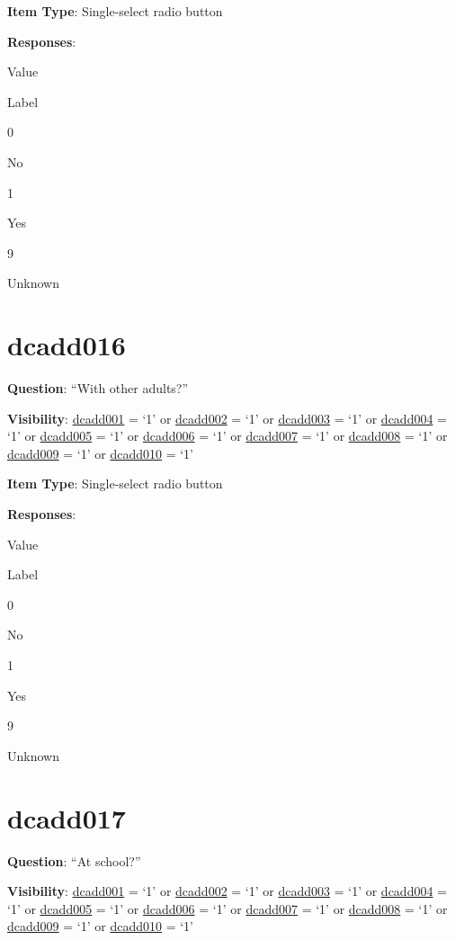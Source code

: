 \documentclass[]{book}
\begin{document}
\textbf{Item Type}: Single-select radio button

\textbf{Responses}:

Value

Label

0

No

1

Yes

9

Unknown

\hypertarget{dcadd016}{%
\section{dcadd016}\label{dcadd016}}

\textbf{Question}: ``With other adults?''

\textbf{Visibility}: \protect\hyperlink{dcadd001}{dcadd001} = `1' or \protect\hyperlink{dcadd002}{dcadd002} = `1' or \protect\hyperlink{dcadd003}{dcadd003} = `1' or \protect\hyperlink{dcadd004}{dcadd004} = `1' or \protect\hyperlink{dcadd005}{dcadd005} = `1' or \protect\hyperlink{dcadd006}{dcadd006} = `1' or \protect\hyperlink{dcadd007}{dcadd007} = `1' or \protect\hyperlink{dcadd008}{dcadd008} = `1' or \protect\hyperlink{dcadd009}{dcadd009} = `1' or \protect\hyperlink{dcadd010}{dcadd010} = `1'

\textbf{Item Type}: Single-select radio button

\textbf{Responses}:

Value

Label

0

No

1

Yes

9

Unknown

\hypertarget{dcadd017}{%
\section{dcadd017}\label{dcadd017}}

\textbf{Question}: ``At school?''

\textbf{Visibility}: \protect\hyperlink{dcadd001}{dcadd001} = `1' or \protect\hyperlink{dcadd002}{dcadd002} = `1' or \protect\hyperlink{dcadd003}{dcadd003} = `1' or \protect\hyperlink{dcadd004}{dcadd004} = `1' or \protect\hyperlink{dcadd005}{dcadd005} = `1' or \protect\hyperlink{dcadd006}{dcadd006} = `1' or \protect\hyperlink{dcadd007}{dcadd007} = `1' or \protect\hyperlink{dcadd008}{dcadd008} = `1' or \protect\hyperlink{dcadd009}{dcadd009} = `1' or \protect\hyperlink{dcadd010}{dcadd010} = `1'
\end{document}
